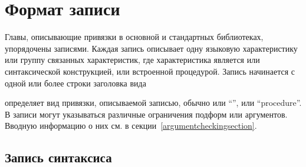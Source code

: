 \chapter{Формат записи}
\label{entryformatchapter}

Главы, описывающие привязки в основной и стандартных библиотеках,
упорядочены записями. Каждая запись описывает одну языковую характеристику или группу
связанных характеристик, где характеристика является или синтаксической конструкцией, или
встроенной процедурой. Запись начинается с одной или более строки заголовка вида

\newpage

\noindent{}\unpenalty

 определяет вид привязки, описываемой записью, обычно или ``\exprtype'', или
``procedure''. В записи могут указываться различные ограничения подформ или аргументов. Вводную
информацию о них см. в секции~\ref{argumentcheckingsection}.\vspace{2mm}

\section{Запись синтаксиса}\vspace{2mm}


